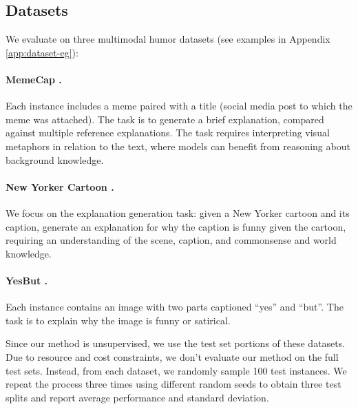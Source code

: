 \subsection{Datasets}
\label{sec:exp_setup:datasets}

We evaluate \method{} on three multimodal humor datasets (see examples in Appendix \ref{app:dataset-eg}):

\paragraph{MemeCap \cite{hwang-shwartz-2023-memecap}.} Each instance includes a meme paired with a title (social media post to which the meme was attached). The task is to generate a brief explanation, compared against multiple reference explanations. The task requires interpreting visual metaphors in relation to the text, where models can benefit from reasoning about background knowledge. 

\paragraph{New Yorker Cartoon \cite{hessel-etal-2023-androids}.} We focus on the explanation generation task: given a New Yorker cartoon and its caption, generate an explanation for why the caption is funny given the cartoon, requiring an understanding of the scene, caption, and commonsense and world knowledge.  

\paragraph{YesBut \cite{nandy-etal-2024-yesbut}.} 
Each instance contains an image with two parts captioned ``yes'' and ``but''. The task is to explain why the image is funny or satirical.

Since our method is unsupervised, we use the test set portions of these datasets. Due to resource and cost constraints, we don't evaluate our method on the full test sets. Instead, from each dataset, we randomly sample 100 test instances. We repeat the process three times using different random seeds to obtain three test splits and report average performance and standard deviation.

